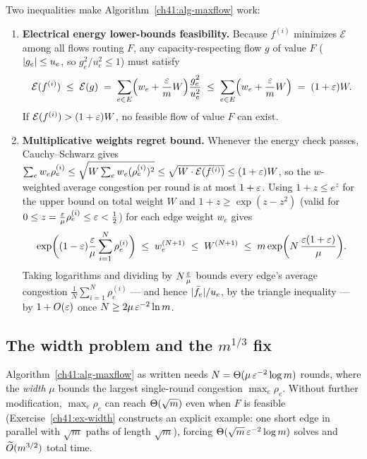 \begin{whybox}
Two inequalities make Algorithm~\ref{ch41:alg-maxflow} work:
\begin{enumerate}
  \item \textbf{Electrical energy lower-bounds feasibility.} Because $f^{(i)}$ minimizes $\mathcal{E}$ among all flows routing $F$, any capacity-respecting flow $g$ of value $F$ ($\lvert g_e\rvert \le u_e$, so $g_e^2/u_e^2 \le 1$) must satisfy
  \[
    \mathcal{E}(f^{(i)}) \;\le\; \mathcal{E}(g) \;=\; \sum_{e \in E} \Bigl(w_e + \frac{\varepsilon}{m}W\Bigr)\frac{g_e^2}{u_e^2} \;\le\; \sum_{e \in E} \Bigl(w_e + \frac{\varepsilon}{m}W\Bigr) \;=\; (1+\varepsilon)W .
  \]
  If $\mathcal{E}(f^{(i)}) > (1+\varepsilon)W$, no feasible flow of value $F$ can exist.
  \item \textbf{Multiplicative weights regret bound.} Whenever the energy check passes, Cauchy--Schwarz gives $\sum_e w_e \rho_e^{(i)} \le \sqrt{W \sum_e w_e (\rho_e^{(i)})^2} \le \sqrt{W \cdot \mathcal{E}(f^{(i)})} \le (1+\varepsilon)W$, so the $w$-weighted average congestion per round is at most $1+\varepsilon$. Using $1 + z \le e^z$ for the upper bound on total weight $W$ and $1 + z \ge \exp(z - z^2)$ (valid for $0 \le z = \frac{\varepsilon}{\mu}\rho_e^{(i)} \le \varepsilon < \frac{1}{2}$) for each edge weight $w_e$ gives
  \begin{align*}
    \exp\biggl((1-\varepsilon)\frac{\varepsilon}{\mu}\sum_{i=1}^N \rho_e^{(i)}\biggr)
    \;\le\; w_e^{(N+1)} \;\le\; W^{(N+1)} \;\le\; m \exp\biggl(N\,\frac{\varepsilon(1+\varepsilon)}{\mu}\biggr) .
  \end{align*}
  Taking logarithms and dividing by $N\frac{\varepsilon}{\mu}$ bounds every edge's average congestion $\frac{1}{N}\sum_{i=1}^N \rho_e^{(i)}$ --- and hence $\lvert\bar{f}_e\rvert/u_e$, by the triangle inequality --- by $1 + O(\varepsilon)$ once $N \ge 2\mu\,\varepsilon^{-2}\ln m$.
\end{enumerate}
\end{whybox}

\subsection{The width problem and the \texorpdfstring{$m^{1/3}$}{m^1/3} fix}\label{ch41:width}

Algorithm~\ref{ch41:alg-maxflow} as written needs $N = \Theta(\mu\,\varepsilon^{-2}\log m)$ rounds, where the \emph{width} $\mu$ bounds the largest single-round congestion $\max_e \rho_e$. Without further modification, $\max_e \rho_e$ can reach $\Theta(\sqrt{m})$ even when $F$ is feasible (Exercise~\ref{ch41:ex-width} constructs an explicit example: one short edge in parallel with $\sqrt{m}$ paths of length $\sqrt{m}$), forcing $\Theta(\sqrt{m}\,\varepsilon^{-2}\log m)$ solves and $\widetilde{O}(m^{3/2})$ total time.

